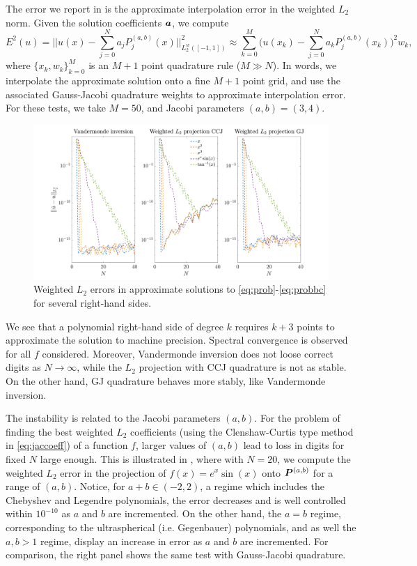 The error we report in  is the approximate interpolation error in the weighted $L_2$ norm. Given the solution coefficients $\boldsymbol{a}$, we compute
\begin{equation}
E^2(u) = \Big|\Big|u(x) - \sum_{j=0}^N a_jP_j^{(a,b)}(x)\Big|\Big|^2_{L_2^w([-1,1])}\approx \sum_{k=0}^M\Big(u(x_k)-\sum_{j=0}^N a_kP_j^{(a,b)}(x_k)\Big)^2w_k,
\end{equation}
where $\{x_k,w_k\}_{k=0}^M$ is an $M+1$ point quadrature rule ($M\gg N$). In words, we interpolate the approximate solution onto a fine $M+1$ point grid, and use the associated Gauss-Jacobi quadrature weights to approximate interpolation error. For these tests, we take $M=50$, and Jacobi parameters $(a,b) = (3,4)$. 
\begin{figure}[H]
	\centering
	\includegraphics[width=1\linewidth]{./figures/errs}
	\caption{Weighted $L_2$ errors in approximate solutions to \eqref{eq:prob}-\eqref{eq:probbc} for several right-hand sides.}\label{fig:errs}
\end{figure}

We see that a polynomial right-hand side of degree $k$ requires $k+3$ points to approximate the solution to machine precision. Spectral convergence is observed for all $f$ considered. Moreover, Vandermonde inversion does not loose correct digits as $N\to \infty$, while the $L_2$ projection with CCJ quadrature is not as stable. On the other hand, GJ quadrature behaves more stably, like Vandermonde inversion. 

The instability is related to the Jacobi parameters $(a,b)$. For the problem of finding the best weighted $L_2$ coefficients (using the Clenshaw-Curtis type method in \eqref{eq:jaccoeff}) of a function $f$, larger values of $(a,b)$ lead to loss in digits for fixed $N$ large enough. This is illustrated in , where with $N=20$, we compute the weighted $L_2$ error in the projection of $f(x)=e^x\sin(x)$ onto $\boldsymbol{P}^{(a,b)}$ for a range of $(a,b)$. Notice, for $a+b \in (-2,2)$, a regime which includes the Chebyshev and Legendre polynomials, the error decreases and is well controlled within $10^{-10}$ as $a$ and $b$ are incremented. On the other hand, the $a=b$ regime, corresponding to the ultraspherical (i.e. Gegenbauer) polynomials, and as well the $a,b>1$ regime, display an increase in error as $a$ and $b$ are incremented. For comparison, the right panel shows the same test with Gauss-Jacobi quadrature.

